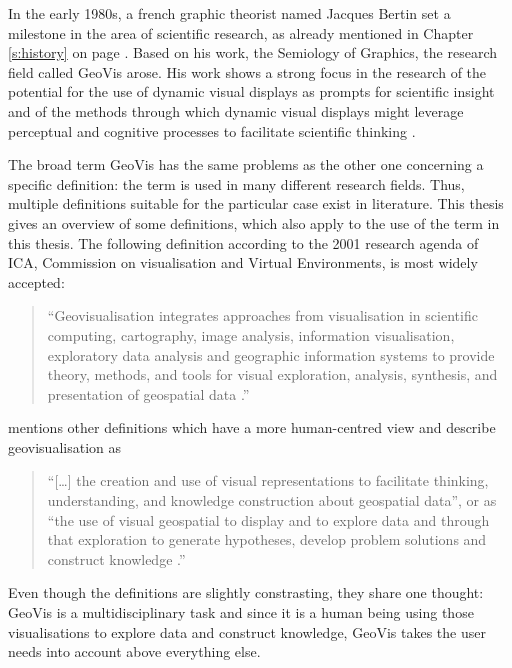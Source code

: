 In the early 1980s, a french graphic theorist named Jacques Bertin set a milestone in the area of scientific research, as already mentioned in Chapter \ref{s:history} on page \pageref{crossref:bertain}. Based on his work, the Semiology of Graphics, the research field called \ac{GeoVis} arose. His work shows a strong focus in the research of the potential for the use of dynamic visual displays as prompts for scientific insight and of the methods through which dynamic visual displays might leverage perceptual and cognitive processes to facilitate scientific thinking .

The broad term \ac{GeoVis} has the same problems as the other one concerning a specific definition: the term is used in many different research fields. Thus, multiple definitions suitable for the particular case exist in literature. This thesis gives an overview of some definitions, which also apply to the use of the term in this thesis.
The following definition according to the 2001 research agenda of \ac{ICA}, Commission on visualisation and Virtual Environments, is most widely accepted:
\begin{quote}
``Geovisualisation integrates approaches from visualisation in scientific computing, cartography, image analysis, information visualisation, exploratory data analysis and geographic information systems to provide theory, methods, and tools for visual exploration, analysis, synthesis, and presentation of geospatial data .''
\end{quote}

\citeauthor{Noellenburg2007} mentions other definitions which have a more human-centred view and describe geovisualisation as
\begin{quote}
``[\ldots] the creation and use of visual representations to facilitate thinking, understanding, and knowledge construction about geospatial data'', or as ``the use of visual geospatial to display and to explore data and through that exploration to generate hypotheses, develop problem solutions and construct knowledge .''
\end{quote}

\newpage
Even though the definitions are slightly constrasting, they share one thought: \ac{GeoVis} is a multidisciplinary task and since it is a human being using those visualisations to explore data and construct knowledge, \ac{GeoVis} takes the user needs into account above everything else.